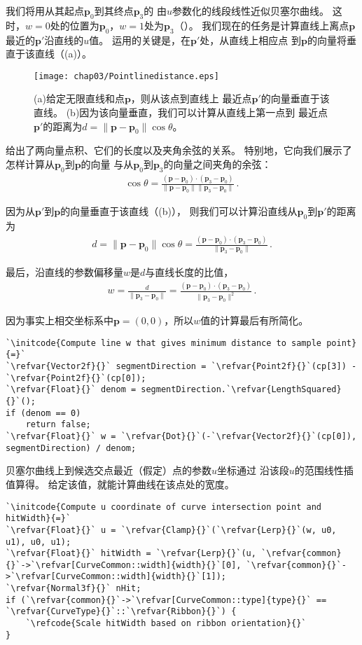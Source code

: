 我们将用从其起点$\bm p_0$到其终点$\bm p_3$的
由$u$参数化的线段线性近似贝塞尔曲线。
这时，$w=0$处的位置为$\bm p_0$，$w=1$处为$\bm p_3$（）。
我们现在的任务是计算直线上离点$\bm p$最近的$\bm p'$沿直线的$u$值。
运用的关键是，在$\bm p'$处，从直线上相应点
到$\bm p$的向量将垂直于该直线（(a)）。
\begin{figure}[htbp]
    \centering\texttt{[image: chap03/Pointlinedistance.eps]}
    \caption{(a)给定无限直线和点$\bm p$，则从该点到直线上
        最近点$\bm p'$的向量垂直于该直线。
        (b)因为该向量垂直，我们可以计算从直线上第一点到
        最近点$\bm p'$的距离为$d=\|\bm p-\bm p_0\|\cos\theta$。}
    \label{fig:3.23}
\end{figure}

给出了两向量点积、它们的长度以及夹角余弦的关系。
特别地，它向我们展示了怎样计算从$\bm p_0$到$\bm p$的向量
与从$\bm p_0$到$\bm p_3$的向量之间夹角的余弦：
\begin{align*}
    \cos\theta=\frac{(\bm p-\bm p_0)\cdot(\bm p_3-\bm p_0)}{\|\bm p-\bm p_0\|\|\bm p_3-\bm p_0\|}\, .
\end{align*}

因为从$\bm p'$到$\bm p$的向量垂直于该直线（(b)），
则我们可以计算沿直线从$\bm p_0$到$\bm p'$的距离为
\begin{align*}
    d=\|\bm p-\bm p_0\|\cos\theta=\frac{(\bm p-\bm p_0)\cdot(\bm p_3-\bm p_0)}{\|\bm p_3-\bm p_0\|}\, .
\end{align*}

最后，沿直线的参数偏移量$w$是$d$与直线长度的比值，
\begin{align*}
    w=\frac{d}{\|\bm p_3-\bm p_0\|}=\frac{(\bm p-\bm p_0)\cdot(\bm p_3-\bm p_0)}{\|\bm p_3-\bm p_0\|^2}\, .
\end{align*}

因为事实上相交坐标系中$\bm p=(0,0)$，所以$w$值的计算最后有所简化。
\begin{lstlisting}
`\initcode{Compute line w that gives minimum distance to sample point}{=}`
`\refvar{Vector2f}{}` segmentDirection = `\refvar{Point2f}{}`(cp[3]) - `\refvar{Point2f}{}`(cp[0]);
`\refvar{Float}{}` denom = segmentDirection.`\refvar{LengthSquared}{}`();
if (denom == 0)
    return false;
`\refvar{Float}{}` w = `\refvar{Dot}{}`(-`\refvar{Vector2f}{}`(cp[0]), segmentDirection) / denom;
\end{lstlisting}

贝塞尔曲线上到候选交点最近（假定）点的参数$u$坐标通过
沿该段$u$的范围线性插值算得。
给定该值，就能计算曲线在该点处的宽度。
\begin{lstlisting}
`\initcode{Compute u coordinate of curve intersection point and hitWidth}{=}`
`\refvar{Float}{}` u = `\refvar{Clamp}{}`(`\refvar{Lerp}{}`(w, u0, u1), u0, u1);
`\refvar{Float}{}` hitWidth = `\refvar{Lerp}{}`(u, `\refvar{common}{}`->`\refvar[CurveCommon::width]{width}{}`[0], `\refvar{common}{}`->`\refvar[CurveCommon::width]{width}{}`[1]);
`\refvar{Normal3f}{}` nHit;
if (`\refvar{common}{}`->`\refvar[CurveCommon::type]{type}{}` == `\refvar{CurveType}{}`::`\refvar{Ribbon}{}`) {
    `\refcode{Scale hitWidth based on ribbon orientation}{}`
}
\end{lstlisting}

